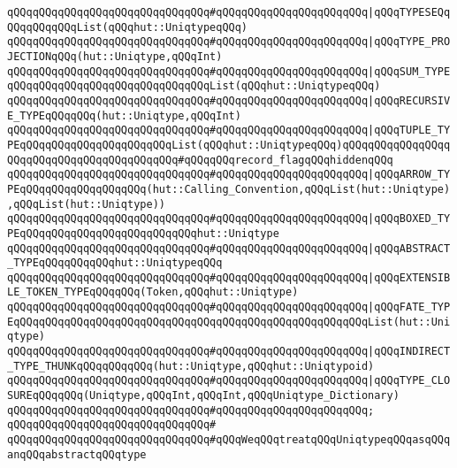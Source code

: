 \verb|qQQqqQQqqQQqqQQqqQQqqQQqqQQqqQQq#qQQqqQQqqQQqqQQqqQQqqQQq|\verb#|qQQqTYPESEQqQQqqQQqqQQqList(qQQqhut::UniqtypeqQQq)#\newline
\verb|qQQqqQQqqQQqqQQqqQQqqQQqqQQqqQQq#qQQqqQQqqQQqqQQqqQQqqQQq|\verb#|qQQqTYPE_PROJECTIONqQQq(hut::Uniqtype,qQQqInt)#\newline
\verb|qQQqqQQqqQQqqQQqqQQqqQQqqQQqqQQq#qQQqqQQqqQQqqQQqqQQqqQQq|\verb#|qQQqSUM_TYPEqQQqqQQqqQQqqQQqqQQqqQQqqQQqqQQqList(qQQqhut::UniqtypeqQQq)#\newline
\verb|qQQqqQQqqQQqqQQqqQQqqQQqqQQqqQQq#qQQqqQQqqQQqqQQqqQQqqQQq|\verb#|qQQqRECURSIVE_TYPEqQQqqQQq(hut::Uniqtype,qQQqInt)#\newline
\verb|qQQqqQQqqQQqqQQqqQQqqQQqqQQqqQQq#qQQqqQQqqQQqqQQqqQQqqQQq|\verb#|qQQqTUPLE_TYPEqQQqqQQqqQQqqQQqqQQqqQQqList(qQQqhut::UniqtypeqQQq)qQQqqQQqqQQqqQQqqQQqqQQqqQQqqQQqqQQqqQQqqQQq#\verb|#qQQqqQQqrecord_flagqQQqhiddenqQQq|\newline
\verb|qQQqqQQqqQQqqQQqqQQqqQQqqQQqqQQq#qQQqqQQqqQQqqQQqqQQqqQQq|\verb#|qQQqARROW_TYPEqQQqqQQqqQQqqQQqqQQq(hut::Calling_Convention,qQQqList(hut::Uniqtype),qQQqList(hut::Uniqtype))#\newline
\verb|qQQqqQQqqQQqqQQqqQQqqQQqqQQqqQQq#qQQqqQQqqQQqqQQqqQQqqQQq|\verb#|qQQqBOXED_TYPEqQQqqQQqqQQqqQQqqQQqqQQqqQQqhut::Uniqtype#\newline
\verb|qQQqqQQqqQQqqQQqqQQqqQQqqQQqqQQq#qQQqqQQqqQQqqQQqqQQqqQQq|\verb#|qQQqABSTRACT_TYPEqQQqqQQqqQQqhut::UniqtypeqQQq#\newline
\verb|qQQqqQQqqQQqqQQqqQQqqQQqqQQqqQQq#qQQqqQQqqQQqqQQqqQQqqQQq|\verb#|qQQqEXTENSIBLE_TOKEN_TYPEqQQqqQQq(Token,qQQqhut::Uniqtype)#\newline
\verb|qQQqqQQqqQQqqQQqqQQqqQQqqQQqqQQq#qQQqqQQqqQQqqQQqqQQqqQQq|\verb#|qQQqFATE_TYPEqQQqqQQqqQQqqQQqqQQqqQQqqQQqqQQqqQQqqQQqqQQqqQQqqQQqqQQqList(hut::Uniqtype)#\newline
\verb|qQQqqQQqqQQqqQQqqQQqqQQqqQQqqQQq#qQQqqQQqqQQqqQQqqQQqqQQq|\verb#|qQQqINDIRECT_TYPE_THUNKqQQqqQQqqQQq(hut::Uniqtype,qQQqhut::Uniqtypoid)#\newline
\verb|qQQqqQQqqQQqqQQqqQQqqQQqqQQqqQQq#qQQqqQQqqQQqqQQqqQQqqQQq|\verb#|qQQqTYPE_CLOSUREqQQqqQQq(Uniqtype,qQQqInt,qQQqInt,qQQqUniqtype_Dictionary)#\newline
\verb|qQQqqQQqqQQqqQQqqQQqqQQqqQQqqQQq#qQQqqQQqqQQqqQQqqQQqqQQq;|\newline
\verb|qQQqqQQqqQQqqQQqqQQqqQQqqQQqqQQq#|\newline
\verb|qQQqqQQqqQQqqQQqqQQqqQQqqQQqqQQq#qQQqWeqQQqtreatqQQqUniqtypeqQQqasqQQqanqQQqabstractqQQqtype|\newline

